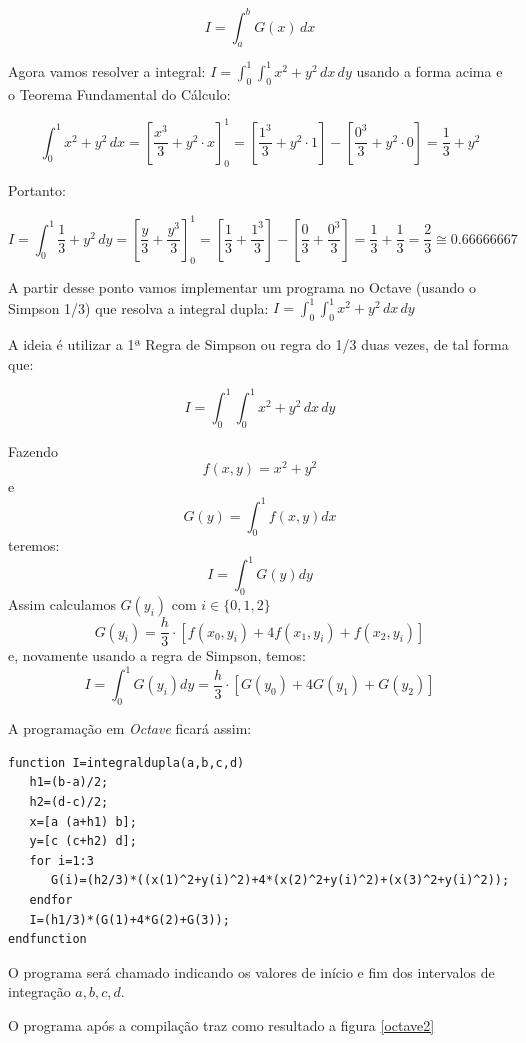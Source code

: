 \documentclass[11pt, openright, a4paper, brazil, openany, oneside]{abntex2}
\begin{document}
$$
I=\displaystyle\int_a^b G(x)\, dx
$$


Agora vamos resolver a integral: $I =\displaystyle \int_0^1 \displaystyle\int_0^1 x^2 + y^2\, dx\, dy$ usando a forma acima e o Teorema Fundamental do Cálculo:

$$
\int_0^1 x^2 + y^2\, dx = \left[\frac{x^3}{3} + y^2\cdot x\right]_0^1 =\left[\frac{1^3}{3}+y^2\cdot 1\right]- \left[\frac{0^3}{3}+y^2\cdot 0\right] = \frac{1}{3}+ y^2
$$

Portanto:

$$
I=\int_0^1 \frac{1}{3}+ y^2\, dy = \left[\frac{y}{3} + \frac{y^3}{3}\right]_0^1 =\left[\frac{1}{3} + \frac{1^3}{3}\right]-\left[\frac{0}{3} + \frac{0^3}{3}\right]= \frac{1}{3} + \frac{1}{3} = \frac{2}{3} \cong 0.66666667
$$

\newpage

A partir desse ponto vamos implementar um programa no Octave (usando o Simpson 1/3) que resolva a integral dupla: $I=\displaystyle\int_0^1\displaystyle\int_0^1 x^2 + y^2\, dx\, dy$

A ideia é utilizar a 1ª Regra de Simpson ou regra do 1/3 duas vezes, de tal forma que:

$$ 
I=\displaystyle\int_0^1\displaystyle\int_0^1 x^2 + y^2\, dx\, dy 
$$

Fazendo 
$$
f(x,y)=x^2 + y^2
$$
e
$$
G(y) = \int_{0}^1 f(x,y) dx 
$$
teremos:
$$
I=\int_0^1 G(y) dy
$$
Assim calculamos $G(y_i)$ com $i \in \{0,1,2\}$
$$
G(y_i)= \frac {h} {3} \cdot \left[ f(x_0,y_i) + 4f(x_1,y_i) + f(x_2,y_i) \right]
$$
e, novamente usando a regra de Simpson, temos:
$$
I=\int_0^1 G(y_i) dy = \frac {h} {3} \cdot \left[ G(y_0) + 4G(y_1) + G(y_2) \right]
$$

A programação em \textit{Octave} ficará assim:

\begin{verbatim}
function I=integraldupla(a,b,c,d)
   h1=(b-a)/2;
   h2=(d-c)/2;
   x=[a (a+h1) b];
   y=[c (c+h2) d];
   for i=1:3
      G(i)=(h2/3)*((x(1)^2+y(i)^2)+4*(x(2)^2+y(i)^2)+(x(3)^2+y(i)^2));
   endfor
   I=(h1/3)*(G(1)+4*G(2)+G(3));
endfunction
\end{verbatim}

O programa será chamado indicando os valores de início e fim dos intervalos de integração $a, b, c, d$.

\newpage

O programa após a compilação traz como resultado a figura \ref{octave2}
\end{document}
